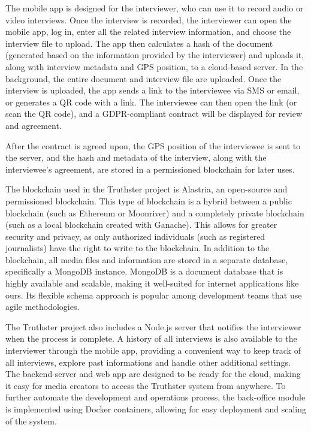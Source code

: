 \documentclass[target=mst,aauheader=]{thud}
\begin{document}
The mobile app is designed for the interviewer, who can use it to record audio or video interviews. Once the interview is recorded, the interviewer can open the mobile app, log in, enter all the related interview information, and choose the interview file to upload. The app then calculates a hash of the document (generated based on the information provided by the interviewer) and uploads it, along with interview metadata and GPS position, to a cloud-based server. In the background, the entire document and interview file are uploaded. Once the interview is uploaded, the app sends a link to the interviewee via SMS or email, or generates a QR code with a link. The interviewee can then open the link (or scan the QR code), and a GDPR-compliant contract will be displayed for review and agreement.\par
After the contract is agreed upon, the GPS position of the interviewee is sent to the server, and the hash and metadata of the interview, along with the interviewee's agreement, are stored in a permissioned blockchain for later uses.

The blockchain used in the Truthster project is Alastria, an open-source and permissioned blockchain. This type of blockchain is a hybrid between a public blockchain (such as Ethereum or Moonriver) and a completely private blockchain (such as a local blockchain created with Ganache).
This allows for greater security and privacy, as only authorized individuals (such as registered journalists) have the right to write to the blockchain.
In addition to the blockchain, all media files and information are stored in a separate database, specifically a MongoDB instance. MongoDB is a document database that is highly available and scalable, making it well-suited for internet applications like ours. Its flexible schema approach is popular among development teams that use agile methodologies.\par

The Truthster project also includes a Node.js server that notifies the interviewer when the process is complete. A history of all interviews is also available to the interviewer through the mobile app, providing a convenient way to keep track of all interviews, explore past informations and handle other additional settings.
The backend server and web app are designed to be ready for the cloud, making it easy for media creators to access the Truthster system from anywhere. To further automate the development and operations process, the back-office module is implemented using Docker containers, allowing for easy deployment and scaling of the system.\par
\end{document}
